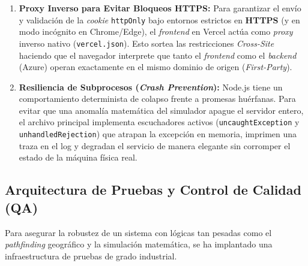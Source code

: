 \begin{enumerate}
    \item \textbf{Proxy Inverso para Evitar Bloqueos HTTPS:} Para garantizar el envío y validación de la \textit{cookie} \texttt{httpOnly} bajo entornos estrictos en \textbf{HTTPS} (y en modo incógnito en Chrome/Edge), el \textit{frontend} en Vercel actúa como \textit{proxy} inverso nativo (\texttt{vercel.json}). Esto sortea las restricciones \textit{Cross-Site} haciendo que el navegador interprete que tanto el \textit{frontend} como el \textit{backend} (Azure) operan exactamente en el mismo dominio de origen (\textit{First-Party}).
    \item \textbf{Resiliencia de Subprocesos (\textit{Crash Prevention}):} Node.js tiene un comportamiento determinista de colapso frente a promesas huérfanas. Para evitar que una anomalía matemática del simulador apague el servidor entero, el archivo principal implementa escuchadores activos (\texttt{uncaughtException} y \texttt{unhandledRejection}) que atrapan la excepción en memoria, imprimen una traza en el log y degradan el servicio de manera elegante sin corromper el estado de la máquina física real.
\end{enumerate}

\subsection{Arquitectura de Pruebas y Control de Calidad (QA)}
Para asegurar la robustez de un sistema con lógicas tan pesadas como el \textit{pathfinding} geográfico y la simulación matemática, se ha implantado una infraestructura de pruebas de grado industrial.

